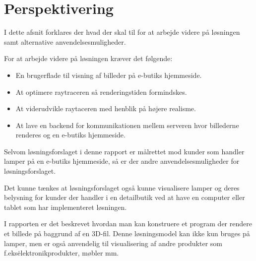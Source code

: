 \section{Perspektivering}
I dette afsnit forklares der hvad der skal til for at arbejde videre på løsningen samt alternative anvendelsesmuligheder. 

For at arbejde videre på løsningen kræver det følgende:

\begin{itemize}
\item En brugerflade til visning af billeder på e-butiks hjemmeside.
\item At optimere raytraceren så renderingstiden formindskes. 
\item At viderudvikle raytaceren med henblik på højere realisme. 
\item At lave en backend for kommunikationen mellem serveren hvor billederne renderes og en e-butiks hjemmeside.
\end{itemize}

Selvom løsningsforslaget i denne rapport er målrettet mod kunder som handler lamper på en e-butiks hjemmeside, så er der andre anvendelsesmuligheder for løsningsforslaget. 

Det kunne tænkes at løsningsforslaget også kunne visualisere lamper og deres belysning for kunder der handler i en detailbutik ved at have en computer eller tablet som har implementeret løsningen. 

I rapporten er det beskrevet hvordan man kan konstruere et program der rendere et billede på baggrund af en 3D-fil. Denne løsningsmodel kan ikke kun bruges på lamper, men er også anvendelig til visualisering af andre produkter som f.eks\. elektronikprodukter, møbler mm. 






\clearpage